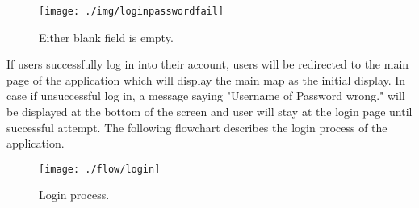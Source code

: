 \documentclass[conference]{IEEEtran}
\begin{document}
\begin{figure}[h!]
\texttt{[image: ./img/loginpasswordfail]}
\centering
\caption{Either blank field is empty.}
\end{figure}

If users successfully log in into their account, users will be redirected to the main page of the application which will display the main map as the initial display. In case if unsuccessful log in, a message saying "Username of Password wrong." will be displayed at the bottom of the screen and user will stay at the login page until successful attempt. The following flowchart describes the login process of the application.

\begin{figure}[h!]
\texttt{[image: ./flow/login]}
\centering
\caption{Login process.}
\end{figure}
\end{document}

